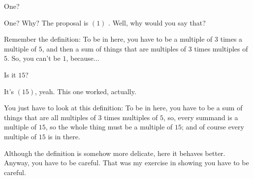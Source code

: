 \begin{student}
One?
\end{student}

\begin{speech}[01:15:33 - 01:16:00]
One? Why? The proposal is $(1)$ . Well, why would you say that?

Remember the definition: To be in here, you have to be a multiple of $3$ times a multiple of $5$, and then a sum of things that are multiples of $3$ times multiples of $5$. So, you can't be $1$, because...
\end{speech}

\begin{student}
Is it $15$?
\end{student}

\begin{speech}[01:16:02 - 01:16:29]
It's $(15)$, yeah. This one worked, actually. 

You just have to look at this definition: To be in here, you have to be a sum of things that are all multiples of $3$ times multiples of $5$, so, every summand is a multiple of $15$, so the whole thing must be a multiple of $15$; and of course every multiple of $15$ is in there.

Although the definition is somehow more delicate, here it behaves better. Anyway, you have to be careful. That was my exercise in showing you have to be careful.
\end{speech}

\begin{content}
\end{content}

